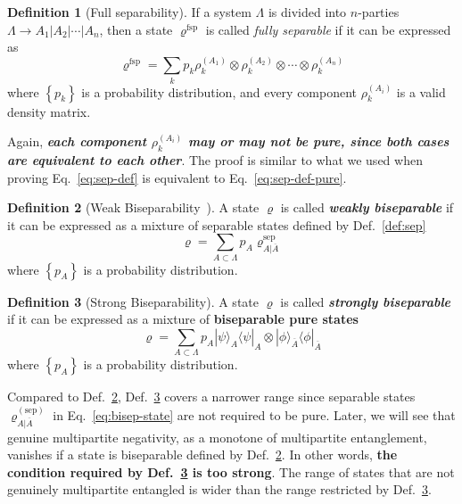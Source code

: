 \documentclass[12font]{article}
\numberwithin{equation}{section}    %
\theoremstyle{definition}
\newtheorem{definition}{Definition}[section]
\newcommand{\bra}[1]{\langle #1 |}
\newcommand{\ket}[1]{| #1 \rangle}
\newcommand{\lrg}[1]{\left\{  #1  \right\}}
\newcommand{\mrm}[1]{\mathrm{#1}}
\begin{document}
\begin{definition}[Full separability]\label{def:fsp}
    If a system $\Lambda$ is divided into $n$-parties $\Lambda \to A_1|A_2|\cdots|A_n$, then a state $\varrho^{\mrm{fsp}}$ is called \textit{fully separable} if it can be expressed as
    \begin{equation}\label{eq:fsp-def}
        \varrho^{\mrm{fsp}} = \sum_{k} p_k \rho^{(A_1)}_{k} \otimes \rho^{(A_2)}_{k} \otimes \cdots \otimes \rho^{(A_n)}_{k}
    \end{equation}
    where $\lrg{p_k}$ is a probability distribution, and every component $\rho_k^{(A_i)}$ is a valid density matrix.
\end{definition}
Again, \textbf{\textit{each component $\rho_k^{(A_i)}$ may or may not be pure, since both cases are equivalent to each other}}. The proof is similar to what we used when proving Eq.~\eqref{eq:sep-def} is equivalent to Eq.~\eqref{eq:sep-def-pure}.

\begin{definition}[Weak Biseparability~\cite{Jungnitsch-Moroder-Guhne_2011}]\label{def:bisep}
    A state $\varrho$ is called \textbf{\textit{weakly biseparable}} if it can be expressed as a mixture of separable states defined by Def.~\ref{def:sep}
    \begin{equation}\label{eq:bisep-state}
        \varrho = \sum_{A \subset \Lambda}p_{A} \varrho^{\mrm{sep}}_{A|\overline{A}}
    \end{equation}
    where $\lrg{p_A}$ is a probability distribution.
\end{definition}

\begin{definition}[Strong Biseparability]\label{def:bisep-2}
    A state $\varrho$ is called \textbf{\textit{strongly biseparable}} if it can be expressed as a mixture of \textbf{biseparable pure states}
    \begin{equation}\label{eq:bisep-state-2}
        \varrho = \sum_{A \subset \Lambda}p_{A} \ket{\psi}_A\bra{\psi}_A \otimes\ket{\phi}_{\overline{A}}\bra{\phi}_{\overline{A}}
    \end{equation}
    where $\lrg{p_A}$ is a probability distribution. 
\end{definition}

Compared to Def.~\ref{def:bisep}, Def.~\ref{def:bisep-2} covers a narrower range since separable states $\varrho^{(\mrm{sep})}_{A|\overline{A}}$ in Eq.~\eqref{eq:bisep-state} are not required to be pure. Later, we will see that genuine multipartite negativity, as a monotone of multipartite entanglement, vanishes if a state is biseparable defined by Def.~\ref{def:bisep}. In other words, \textbf{the condition required by Def.~\ref{def:bisep-2} is too strong}. The range of states that are not genuinely multipartite entangled is wider than the range restricted by Def.~\ref{def:bisep-2}. 
\end{document}
